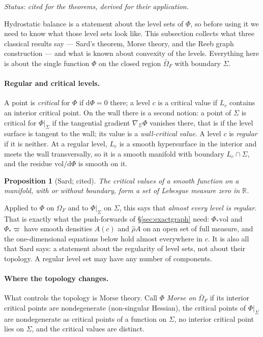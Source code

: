 \documentclass[11pt]{article}
\newtheorem{proposition}{Proposition}
\theoremstyle{definition}
\theoremstyle{remark}
\newcommand{\R}{\mathbb{R}}
\newcommand{\gradS}{\nabla_\Sigma}
\newcommand{\vol}{\mathrm{vol}}
\newcommand{\status}[1]{\noindent\emph{Status: #1}\par\smallskip}
\begin{document}
\status{cited for the theorems, derived for their application.}

Hydrostatic balance is a statement about the level sets of $\Phi$, so
before using it we need to know what those level sets look like. This
subsection collects what three classical results say --- Sard's
theorem, Morse theory, and the Reeb graph construction --- and what is
known about convexity of the levels. Everything here is about the
single function $\Phi$ on the closed region $\bar\Omega_F$ with
boundary $\Sigma$.

\paragraph{Regular and critical levels.} A point is \emph{critical}
for $\Phi$ if $\mathrm d\Phi = 0$ there; a level $c$ is a critical
value if $L_c$ contains an interior critical point. On the wall there
is a second notion: a point of $\Sigma$ is critical for $\Phi|_\Sigma$
if the tangential gradient $\gradS\Phi$ vanishes there, that is if the
level surface is tangent to the wall; its value is a
\emph{wall-critical value}. A level $c$ is \emph{regular} if it is
neither. At a regular level, $L_c$ is a smooth hypersurface in the
interior and meets the wall transversally, so it is a smooth manifold
with boundary $L_c\cap\Sigma$, and the residue $\vol/\mathrm d\Phi$ is
smooth on it.

\begin{proposition}[Sard; cited]
\label{prop:sard}
The critical values of a smooth function on a manifold, with or
without boundary, form a set of Lebesgue measure zero in $\R$.
\end{proposition}

Applied to $\Phi$ on $\Omega_F$ and to $\Phi|_\Sigma$ on $\Sigma$,
this says that \emph{almost every level is regular}. That is exactly
what the push-forwards of \S\ref{sec:exactgraph} need: $\Phi_*\vol$ and
$\Phi_*\varpi$ have smooth densities $A(c)$ and $\hat\rho A$ on an
open set of full measure, and the one-dimensional equations below hold
almost everywhere in $c$. It is also all that Sard says: a statement
about the regularity of level sets, not about their topology. A
regular level set may have any number of components.

\paragraph{Where the topology changes.} What controls the topology is
Morse theory. Call $\Phi$ \emph{Morse on} $\bar\Omega_F$ if its
interior critical points are nondegenerate (non-singular Hessian), the
critical points of $\Phi|_\Sigma$ are nondegenerate as critical points
of a function on $\Sigma$, no interior critical point lies on
$\Sigma$, and the critical values are distinct.
\end{document}
